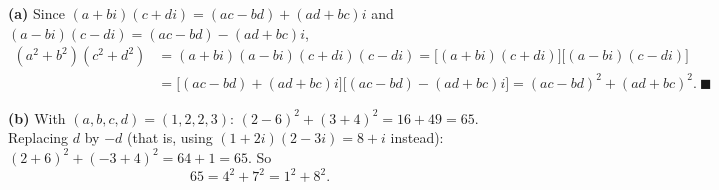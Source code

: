 \textbf{(a)} Since $(a+bi)(c+di)=(ac-bd)+(ad+bc)i$ and $(a-bi)(c-di)=(ac-bd)-(ad+bc)i$,
\begin{align*}
\left(a^2+b^2\right)\left(c^2+d^2\right)&=(a+bi)(a-bi)(c+di)(c-di)=\bigl[(a+bi)(c+di)\bigr]\bigl[(a-bi)(c-di)\bigr]\\
&=\bigl[(ac-bd)+(ad+bc)i\bigr]\bigl[(ac-bd)-(ad+bc)i\bigr]=(ac-bd)^2+(ad+bc)^2.\ \blacksquare
\end{align*}

\textbf{(b)} With $(a,b,c,d)=(1,2,2,3)$: $(2-6)^2+(3+4)^2=16+49=65$. Replacing $d$ by $-d$ (that is, using $(1+2i)(2-3i)=8+i$ instead): $(2+6)^2+(-3+4)^2=64+1=65$. So
\[65=\boxed{4^2+7^2=1^2+8^2}.\]
